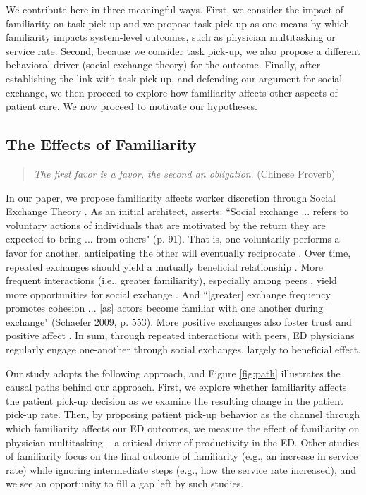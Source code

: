  We contribute here in three meaningful ways. First, we consider the impact of familiarity on task pick-up and we propose task pick-up as one means by which familiarity impacts system-level outcomes, such as physician multitasking or service rate. Second, because we consider task pick-up, we also propose a different behavioral driver (social exchange theory) for the outcome. Finally, after establishing the link with task pick-up, and defending our argument for social exchange, we then proceed to explore how familiarity affects other aspects of patient care. We now proceed to motivate our hypotheses.

 \subsection{The Effects of Familiarity}
 \begin{quote}
      \textit{The first favor is a favor, the second an obligation}. (Chinese Proverb)
 \end{quote}
 In our paper, we propose familiarity affects worker discretion through Social Exchange Theory \citep[for disucssion, see][]{Cook2013}. As an initial architect, \cite{Blau1964} asserts: “Social exchange ... refers to voluntary actions of individuals that are motivated by the return they are expected to bring ... from others" (p. 91). That is, one voluntarily performs a favor for another, anticipating the other will eventually reciprocate \citep{Gouldner1960}. Over time, repeated exchanges should yield a mutually beneficial relationship \citep{Hofmann1999,Cropanzano2005}. More frequent interactions (i.e., greater familiarity), especially among peers \citep{Lawler1993,Lawler1998,Deckop2003}, yield more opportunities for social exchange \citep{Homans1950,Homans1961}. And “[greater] exchange frequency promotes cohesion ... [as] actors become familiar with one another during exchange" (Schaefer 2009, p. 553). More positive exchanges also foster trust and positive affect \citep{Lawler1993,Lawler1998,Lawler2000,Flynn2003,Flynn2005}. In sum, through repeated interactions with peers, ED physicians regularly engage one-another through social exchanges, largely to beneficial effect. 
 
 Our study adopts the following approach, and Figure \ref{fig:path} illustrates the causal paths behind our approach. First, we explore whether familiarity affects the patient pick-up decision as we examine the resulting change in the patient pick-up rate. Then, by proposing patient pick-up behavior as the channel through which familiarity affects our ED outcomes, we measure the effect of familiarity on physician multitasking -- a critical driver of productivity in the ED. Other studies of familiarity focus on the final outcome of familiarity (e.g., an increase in service rate) while ignoring intermediate steps (e.g., how the service rate increased), and we see an opportunity to fill a gap left by such studies. 
 
